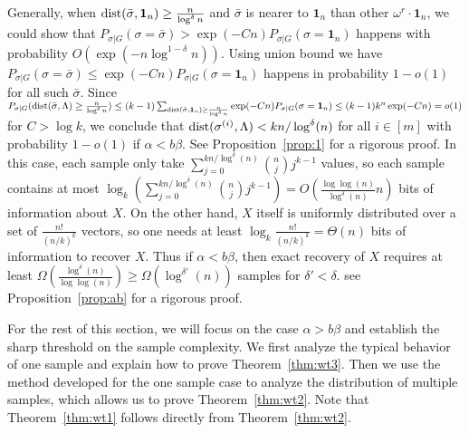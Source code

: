 \documentclass{article}
\begin{document}
Generally, when $\operatorname{dist}(\bar{\sigma}, \mathbf{1}_n) \geq \frac{n}{\log^{\delta} n}$ and $\bar{\sigma}$
is nearer to $\mathbf{1}_{n}$ than other $\omega^r \cdot \mathbf{1}_n$, we could show that
$P_{\sigma | G}(\sigma = \bar{\sigma} ) > \exp(-Cn) P_{\sigma | G}(\sigma = \mathbf{1}_n)$
happens with probability $O(\exp(-n \log^{1-\delta} n ))$. Using union bound we have
$P_{\sigma | G}(\sigma = \bar{\sigma} ) \leq \exp(-Cn) P_{\sigma | G}(\sigma = \mathbf{1}_n)$
happens in probability $1-o(1)$ for all such $\bar{\sigma}$.
Since $P_{\sigma | G}(\operatorname{dist}(\bar{\sigma}, \Lambda)\geq \frac{n}{\log^{\delta} n}) \leq
(k-1)\sum_{\operatorname{dist}(\bar{\sigma}, \mathbf{1}_n) \geq \frac{n}{\log^{\delta} n}}\exp(-Cn) P_{\sigma | G}(\sigma = \mathbf{1}_n)
\leq (k-1)k^n \exp(-Cn) = o(1)$ for $C> \log k$, we conclude that
$\operatorname{dist}(\sigma^{(i)}, \Lambda)< kn/\log^{\delta}(n)$ for all $i\in[m]$ with probability $1-o(1)$ if $\alpha<b\beta$. See Proposition~\ref{prop:1} for a rigorous proof.
In this case, each sample only take $\sum_{j=0}^{kn/\log^{\delta}(n)}\binom{n}{j}j^{k-1}$ values, so each sample contains at most $\log_k(\sum_{j=0}^{kn/\log^{\delta}(n)}\binom{n}{j}j^{k-1})=O(\frac{\log\log(n)}{\log^{\delta}(n)} n)$ bits of information about $X$. On the other hand, $X$ itself is uniformly distributed over a set of $\frac{n!}{(n/k)^k}$ vectors, so one needs at least $\log_k\frac{n!}{(n/k)^k}=\Theta(n)$ bits of information to recover $X$. Thus if $\alpha<b\beta$, then exact recovery of $X$ requires at least $\Omega(\frac{\log^{\delta}(n)}{\log\log(n)})\ge \Omega(\log^{\delta'}(n))$ samples for $\delta'<\delta$. see Proposition~\ref{prop:ab} for a rigorous proof.


For the rest of this section, we will focus on the case $\alpha>b\beta$ and establish the sharp threshold on the sample complexity. We first analyze the typical behavior of one sample and explain how to prove Theorem~\ref{thm:wt3}. Then we use the method developed for the one sample case to analyze the distribution of multiple samples, which allows us to prove Theorem~\ref{thm:wt2}. Note that Theorem~\ref{thm:wt1} follows directly from Theorem~\ref{thm:wt2}.
\end{document}
